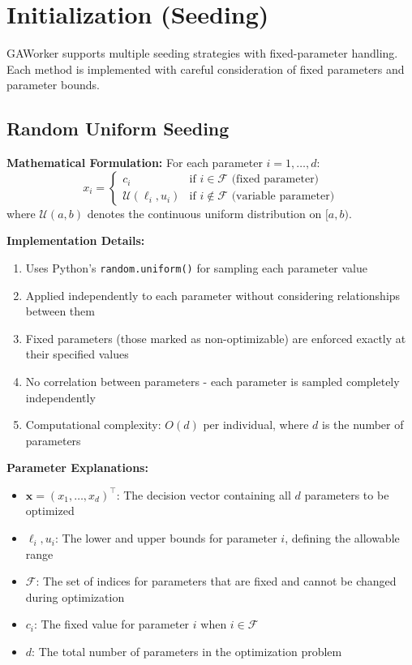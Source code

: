 \documentclass[12pt,a4paper]{article}
\begin{document}
\section{Initialization (Seeding)}
GAWorker supports multiple seeding strategies with fixed-parameter handling. Each method is implemented with careful consideration of fixed parameters and parameter bounds.

\subsection{Random Uniform Seeding}
\textbf{Mathematical Formulation:}
For each parameter $i = 1, \dots, d$:
\begin{equation}
x_i = \begin{cases}
c_i & \text{if } i \in \mathcal{F} \text{ (fixed parameter)} \\
\mathcal{U}(\ell_i, u_i) & \text{if } i \notin \mathcal{F} \text{ (variable parameter)}
\end{cases} \label{eq:random_seeding}
\end{equation}
where $\mathcal{U}(a,b)$ denotes the continuous uniform distribution on $[a,b)$.

\textbf{Implementation Details:}
\begin{enumerate}
\item Uses Python's \texttt{random.uniform()} for sampling each parameter value
\item Applied independently to each parameter without considering relationships between them
\item Fixed parameters (those marked as non-optimizable) are enforced exactly at their specified values
\item No correlation between parameters - each parameter is sampled completely independently
\item Computational complexity: $O(d)$ per individual, where $d$ is the number of parameters
\end{enumerate}

\textbf{Parameter Explanations:}
\begin{itemize}
\item $\bm{x} = (x_1, \dots, x_d)^\top$: The decision vector containing all $d$ parameters to be optimized
\item $\ell_i, u_i$: The lower and upper bounds for parameter $i$, defining the allowable range
\item $\mathcal{F}$: The set of indices for parameters that are fixed and cannot be changed during optimization
\item $c_i$: The fixed value for parameter $i$ when $i \in \mathcal{F}$
\item $d$: The total number of parameters in the optimization problem
\end{itemize}
\end{document}
